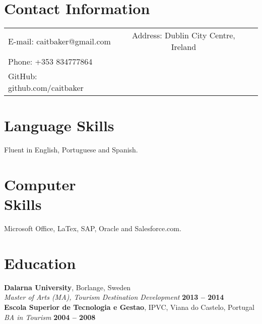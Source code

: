 \documentclass[margin,line]{resume}
\begin{document}
\begin{resume}

    \section{\mysidestyle Contact Information}

   \begin{tabular}{ l c l}
   E-mail: caitbaker@gmail.com &  Address: Dublin City Centre, Ireland\\
   Phone: +353 834777864\\
   GitHub: github.com/caitbaker\\
    \end{tabular}

    \section{\mysidestyle Language Skills}
    Fluent in English, Portuguese and Spanish.
       
    \section{\mysidestyle Computer \\Skills}
    Microsoft Office, LaTex, SAP, Oracle and Salesforce.com. 
    
    \section{\mysidestyle Education}
    \textbf{Dalarna University}, Borlange, Sweden \vspace{2mm}\\\vspace{1mm}%
    \textsl{Master of Arts (MA), Tourism Destination Development}\hfill \textbf{ 2013 -- 2014}\\
    \textbf{Escola Superior de Tecnologia e Gestao}, IPVC, Viana do Castelo, Portugal \vspace{2mm}\\\vspace{1mm}%
    \textsl{BA in Tourism}\hfill \textbf{ 2004 -- 2008}\\


\end{resume}
\end{document}
